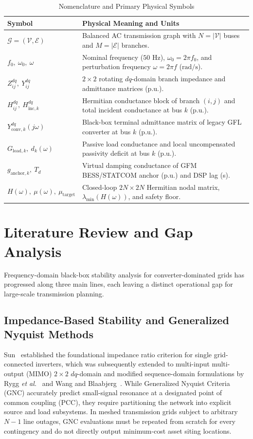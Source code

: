 \documentclass[10pt,twocolumn]{article}
\begin{document}
\begin{table}[t]
\centering
\caption{Nomenclature and Primary Physical Symbols}
\label{tab:nomen}
\footnotesize
\setlength{\tabcolsep}{4pt}
\begin{tabular}{@{}p{}p{}@{}}
\toprule
\textbf{Symbol} & \textbf{Physical Meaning and Units} \\
\midrule
$\mathcal{G}=(\mathcal{V},\mathcal{E})$ & Balanced AC transmission graph with $N=|\mathcal{V}|$ buses and $M=|\mathcal{E}|$ branches. \\
$f_0,\ \omega_0,\ \omega$ & Nominal frequency ($50\text{ Hz}$), $\omega_0=2\pi f_0$, and perturbation frequency $\omega=2\pi f$ ($\text{rad/s}$). \\
$Z_{ij}^{dq},\ Y_{ij}^{dq}$ & $2\times 2$ rotating $dq$-domain branch impedance and admittance matrices (p.u.). \\
$H_{ij}^{dq},\ H_{\text{inc},k}^{dq}$ & Hermitian conductance block of branch $(i,j)$ and total incident conductance at bus $k$ (p.u.). \\
$Y_{\text{conv},k}^{dq}(j\omega)$ & Black-box terminal admittance matrix of legacy GFL converter at bus $k$ (p.u.). \\
$G_{\text{load},k},\ d_k(\omega)$ & Passive load conductance and local uncompensated passivity deficit at bus $k$ (p.u.). \\
$g_{\text{anchor},k},\ T_d$ & Virtual damping conductance of GFM BESS/STATCOM anchor (p.u.) and DSP lag (s). \\
$H(\omega),\ \mu(\omega),\ \mu_{\text{target}}$ & Closed-loop $2N\times 2N$ Hermitian nodal matrix, $\lambda_{\min}(H(\omega))$, and safety floor. \\
\bottomrule
\end{tabular}
\end{table}

\section{Literature Review and Gap Analysis}
Frequency-domain black-box stability analysis for converter-dominated grids has progressed along three main lines, each leaving a distinct operational gap for large-scale transmission planning.

\subsection{Impedance-Based Stability and Generalized Nyquist Methods}
Sun~\cite{sun2011impedance} established the foundational impedance ratio criterion for single grid-connected inverters, which was subsequently extended to multi-input multi-output (MIMO) $2\times 2$ $dq$-domain and modified sequence-domain formulations by Rygg \textit{et al.}~\cite{rygg2016modified} and Wang and Blaabjerg~\cite{wang2018harmonic}. While Generalized Nyquist Criteria (GNC) accurately predict small-signal resonance at a designated point of common coupling (PCC), they require partitioning the network into explicit source and load subsystems. In meshed transmission grids subject to arbitrary $N-1$ line outages, GNC evaluations must be repeated from scratch for every contingency and do not directly output minimum-cost asset siting locations.
\end{document}
